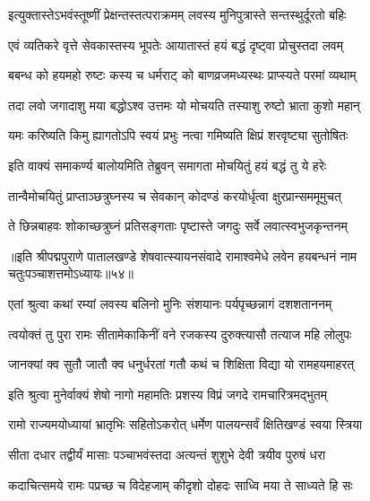 \twolineshloka
{इत्युक्तास्तेऽभवंस्तूष्णीं प्रेक्षन्तस्तत्पराक्रमम्}
{लवस्य मुनिपुत्रास्ते सन्तस्थुर्दूरतो बहिः}%

\twolineshloka
{एवं व्यतिकरे वृत्ते सेवकास्तस्य भूपतेः}
{आयातास्तं हयं बद्धं दृष्ट्वा प्रोचुस्तदा लवम्}%

\twolineshloka
{बबन्ध को हयमहो रुष्टः कस्य च धर्मराट्}
{को बाणव्रजमध्यस्थः प्राप्स्यते परमां व्यथाम्}%

\twolineshloka
{तदा लवो जगादाशु मया बद्धोऽश्व उत्तमः}
{यो मोचयति तस्याशु रुष्टो भ्राता कुशो महान्}%

\twolineshloka
{यमः करिष्यति किमु ह्यागतोऽपि स्वयं प्रभुः}
{नत्वा गमिष्यति क्षिप्रं शरवृष्ट्या सुतोषितः}%


\twolineshloka
{इति वाक्यं समाकर्ण्य बालोयमिति तेब्रुवन्}
{समागता मोचयितुं हयं बद्धं तु ये हरेः}%

\twolineshloka
{तान्वैमोचयितुं प्राप्ताञ्छत्रुघ्नस्य च सेवकान्}
{कोदण्डं करयोर्धृत्वा क्षुरप्रान्सममूमुचत्}%

\twolineshloka
{ते छिन्नबाहवः शोकाच्छत्रुघ्नं प्रतिसङ्गताः}
{पृष्टास्ते जगदुः सर्वे लवात्स्वभुजकृन्तनम्}%

{॥इति श्रीपद्मपुराणे पातालखण्डे शेषवात्स्यायनसंवादे रामाश्वमेधे लवेन हयबन्धनं नाम चतुःपञ्चाशत्तमोऽध्यायः॥५४॥}



\twolineshloka
{एतां श्रुत्वा कथां रम्यां लवस्य बलिनो मुनिः}
{संशयानः पर्यपृच्छन्नागं दशशताननम्}%


\twolineshloka
{त्वयोक्तं तु पुरा रामः सीतामेकाकिनीं वने}
{रजकस्य दुरुक्त्यासौ तत्याज महि लोलुपः}%

\twolineshloka
{जानक्यां क्व सुतौ जातौ क्व धनुर्धरतां गतौ}
{कथं च शिक्षिता विद्या यो रामहयमाहरत्}%


\twolineshloka
{इति श्रुत्वा मुनेर्वाक्यं शेषो नागो महामतिः}
{प्रशस्य विप्रं जगदे रामचारित्रमद्भुतम्}%


\twolineshloka
{रामो राज्यमयोध्यायां भ्रातृभिः सहितोऽकरोत्}
{धर्मेण पालयन्सर्वं क्षितिखण्डं स्वया स्त्रिया}%

\twolineshloka
{सीता दधार तद्वीर्यं मासाः पञ्चाभवंस्तदा}
{अत्यन्तं शुशुभे देवी त्रयीव पुरुषं धरा}%

\twolineshloka
{कदाचित्समये रामः पप्रच्छ च विदेहजाम्}
{कीदृशो दोहदः साध्वि मया ते साध्यते हि सः}%

